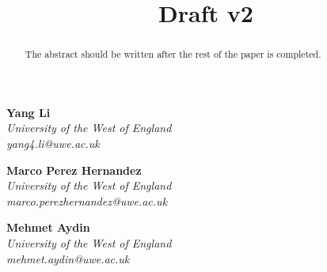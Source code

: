 \documentclass[a4paper]{article}
\title{
    \textbf{Draft v2}
}
\date{}
\begin{document}
\maketitle
\vspace{-1.5cm}

\begin{multicols}{3}
    \centering
    \textbf{Yang Li}\\
    \textit{University of the West of England}\\
    \textit{yang4.li@uwe.ac.uk}\\
    \vfill

    \textbf{Marco Perez Hernandez}\\
    \textit{University of the West of England}\\
    \textit{marco.perezhernandez@uwe.ac.uk}\\
    \vfill

    \textbf{Mehmet Aydin}\\
    \textit{University of the West of England}\\
    \textit{mehmet.aydin@uwe.ac.uk}\\
    \vfill
\end{multicols}

\singlespacing
\setlength{\parskip}{6pt}
\setlength{\parindent}{0.5cm}

\begin{abstract}
The abstract should be written after the rest of the paper is completed.
\end{abstract}
\end{document}
